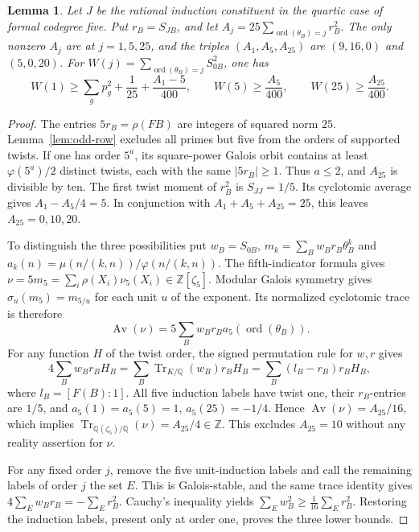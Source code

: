 \documentclass[11pt,a4paper]{article}
\newtheorem{lemma}[theorem]{Lemma}
\numberwithin{equation}{section}
\begin{document}
\begin{lemma}\label{lem:quartic-five-row-masses}
Let $J$ be the rational induction constituent in the quartic case of formal codegree five. Put $r_B=S_{JB}$, and let $A_j=25\sum_{\operatorname{ord}(\theta_B)=j}r_B^2$. The only nonzero $A_j$ are at $j=1,5,25$, and the triples $(A_1,A_5,A_{25})$ are $(9,16,0)$ and $(5,0,20)$. For $W(j)=\sum_{\operatorname{ord}(\theta_B)=j}S_{0B}^2$, one has
\[
 W(1)\ge\sum_g p_g^2+\frac1{25}+\frac{A_1-5}{400},
 \qquad W(5)\ge\frac{A_5}{400},\qquad W(25)\ge\frac{A_{25}}{400}.
\]
\end{lemma}
\begin{proof}
The entries $5r_B=\rho(FB)$ are integers of squared norm $25$. Lemma~\ref{lem:odd-row} excludes all primes but five from the orders of supported twists. If one has order $5^a$, its square-power Galois orbit contains at least $\varphi(5^a)/2$ distinct twists, each with the same $|5r_B|\ge1$. Thus $a\le2$, and $A_{25}$ is divisible by ten. The first twist moment of $r_B^2$ is $S_{JJ}=1/5$. Its cyclotomic average gives $A_1-A_5/4=5$. In conjunction with $A_1+A_5+A_{25}=25$, this leaves $A_{25}=0,10,20$.

To distinguish the three possibilities put $w_B=S_{0B}$, $m_k=\sum_B w_Br_B\theta_B^k$ and $a_k(n)=\mu(n/(k,n))/\varphi(n/(k,n))$. The fifth-indicator formula gives $\nu=5m_5=\sum_i\rho(X_i)\nu_5(X_i)\in\mathbb Z[\zeta_5]$. Modular Galois symmetry gives $\sigma_u(m_5)=m_{5/u}$ for each unit $u$ of the exponent. Its normalized cyclotomic trace is therefore
\[
 \operatorname{Av}(\nu)=5\sum_B w_Br_B a_5(\operatorname{ord}(\theta_B)).
\]
For any function $H$ of the twist order, the signed permutation rule for $w,r$ gives
\[
 4\sum_B w_Br_B H_B
 =\sum_B\operatorname{Tr}_{K/\mathbb Q}(w_B)r_B H_B
 =\sum_B (l_B-r_B)r_B H_B,
\]
where $l_B=[F(B):1]$. All five induction labels have twist one, their $r_B$-entries are $1/5$, and $a_5(1)=a_5(5)=1$, $a_5(25)=-1/4$. Hence $\operatorname{Av}(\nu)=A_{25}/16$, which implies
$\operatorname{Tr}_{\mathbb Q(\zeta_5)/\mathbb Q}(\nu)=A_{25}/4\in\mathbb Z$. This excludes $A_{25}=10$ without any reality assertion for $\nu$.

For any fixed order $j$, remove the five unit-induction labels and call the remaining labels of order $j$ the set $E$. This is Galois-stable, and the same trace identity gives $4\sum_E w_Br_B=-\sum_Er_B^2$. Cauchy's inequality yields $\sum_Ew_B^2\ge\frac1{16}\sum_Er_B^2$. Restoring the induction labels, present only at order one, proves the three lower bounds.
\end{proof}
\end{document}
